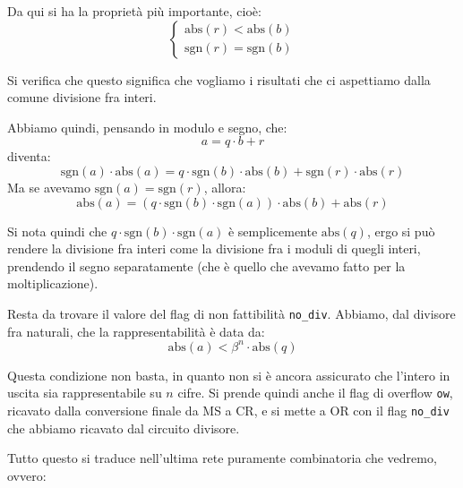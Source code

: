 \documentclass[a4paper,11pt]{article}
\begin{document}
Da qui si ha la proprietà più importante, cioè:
\[
	\begin{cases}
		\mathrm{abs}(r) < \mathrm{abs}(b) \\ 
		\mathrm{sgn}(r) = \mathrm{sgn}(b)
	\end{cases}
\]

Si verifica che questo significa che vogliamo i risultati che ci aspettiamo dalla comune divisione fra interi.

Abbiamo quindi, pensando in modulo e segno, che:
$$
a = q \cdot b + r 
$$
diventa:
$$
\mathrm{sgn}(a) \cdot \mathrm{abs}(a) = q \cdot \mathrm{sgn}(b) \cdot \mathrm{abs}(b) + \mathrm{sgn}(r) \cdot \mathrm{abs}(r)
$$
Ma se avevamo $\mathrm{sgn}(a) = \mathrm{sgn}(r)$, allora:
$$
\mathrm{abs}(a) = \left( q \cdot \mathrm{sgn}(b) \cdot \mathrm{sgn}(a) \right) \cdot \mathrm{abs}(b) + \mathrm{abs}(r)
$$

Si nota quindi che $ q \cdot \mathrm{sgn}(b) \cdot \mathrm{sgn}(a) $ è semplicemente $\mathrm{abs}(q)$, ergo si può rendere la divisione fra interi come la divisione fra i moduli di quegli interi, prendendo il segno separatamente (che è quello che avevamo fatto per la moltiplicazione).

Resta da trovare il valore del flag di non fattibilità \lstinline|no_div|.
Abbiamo, dal divisore fra naturali, che la rappresentabilità è data da:
$$
\mathrm{abs}(a) < \beta^n \cdot \mathrm{abs}(q)
$$

Questa condizione non basta, in quanto non si è ancora assicurato che l'intero in uscita sia rappresentabile su $n$ cifre.
Si prende quindi anche il flag di overflow \lstinline|ow|, ricavato dalla conversione finale da MS a CR, e si mette a OR con il flag \lstinline|no_div| che abbiamo ricavato dal circuito divisore.

Tutto questo si traduce nell'ultima rete puramente combinatoria che vedremo, ovvero:


\end{document}
